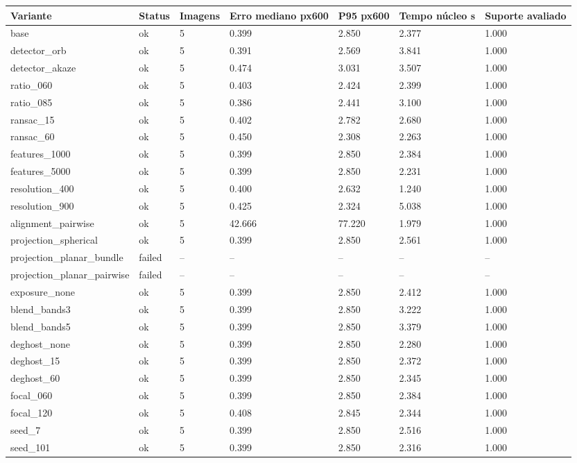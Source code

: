 \begin{tabular}{lllllll}
\hline
Variante & Status & Imagens & Erro mediano px600 & P95 px600 & Tempo núcleo s & Suporte avaliado \\ \hline
base & ok & 5 & 0.399 & 2.850 & 2.377 & 1.000 \\
detector\_orb & ok & 5 & 0.391 & 2.569 & 3.841 & 1.000 \\
detector\_akaze & ok & 5 & 0.474 & 3.031 & 3.507 & 1.000 \\
ratio\_060 & ok & 5 & 0.403 & 2.424 & 2.399 & 1.000 \\
ratio\_085 & ok & 5 & 0.386 & 2.441 & 3.100 & 1.000 \\
ransac\_15 & ok & 5 & 0.402 & 2.782 & 2.680 & 1.000 \\
ransac\_60 & ok & 5 & 0.450 & 2.308 & 2.263 & 1.000 \\
features\_1000 & ok & 5 & 0.399 & 2.850 & 2.384 & 1.000 \\
features\_5000 & ok & 5 & 0.399 & 2.850 & 2.231 & 1.000 \\
resolution\_400 & ok & 5 & 0.400 & 2.632 & 1.240 & 1.000 \\
resolution\_900 & ok & 5 & 0.425 & 2.324 & 5.038 & 1.000 \\
alignment\_pairwise & ok & 5 & 42.666 & 77.220 & 1.979 & 1.000 \\
projection\_spherical & ok & 5 & 0.399 & 2.850 & 2.561 & 1.000 \\
projection\_planar\_bundle & failed & -- & -- & -- & -- & -- \\
projection\_planar\_pairwise & failed & -- & -- & -- & -- & -- \\
exposure\_none & ok & 5 & 0.399 & 2.850 & 2.412 & 1.000 \\
blend\_bands3 & ok & 5 & 0.399 & 2.850 & 3.222 & 1.000 \\
blend\_bands5 & ok & 5 & 0.399 & 2.850 & 3.379 & 1.000 \\
deghost\_none & ok & 5 & 0.399 & 2.850 & 2.280 & 1.000 \\
deghost\_15 & ok & 5 & 0.399 & 2.850 & 2.372 & 1.000 \\
deghost\_60 & ok & 5 & 0.399 & 2.850 & 2.345 & 1.000 \\
focal\_060 & ok & 5 & 0.399 & 2.850 & 2.384 & 1.000 \\
focal\_120 & ok & 5 & 0.408 & 2.845 & 2.344 & 1.000 \\
seed\_7 & ok & 5 & 0.399 & 2.850 & 2.516 & 1.000 \\
seed\_101 & ok & 5 & 0.399 & 2.850 & 2.316 & 1.000 \\
\hline
\end{tabular}
